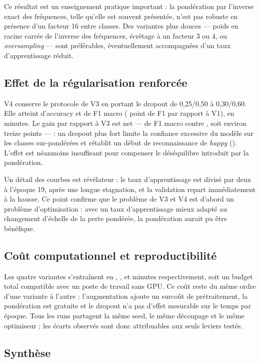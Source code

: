 \documentclass[11pt,a4paper]{article}
\begin{document}
Ce résultat est un enseignement pratique important : la pondération par
l'inverse exact des fréquences, telle qu'elle est souvent présentée, n'est pas
robuste en présence d'un facteur 16 entre classes. Des variantes plus douces
— poids en racine carrée de l'inverse des fréquences, écrêtage à un facteur 3
ou 4, ou \emph{oversampling} — sont préférables, éventuellement accompagnées
d'un taux d'apprentissage réduit.

\subsection{Effet de la régularisation renforcée}

V4 conserve le protocole de V3 en portant le dropout de 0,25/0,50 à
0,30/0,60. Elle atteint \AccFour{} d'accuracy et \FFour{} de F1 macro
(\GapFFour{} point de F1 par rapport à V1), en \TimeFour{} minutes. Le gain par
rapport à V3 est net — \FFour{} de F1 macro contre \FThree{}, soit environ
treize points — : un dropout plus fort limite la confiance excessive du modèle
sur les classes sur-pondérées et rétablit un début de reconnaissance de
\emph{happy} (\FHappyFour). L'effet est néanmoins insuffisant pour compenser le
déséquilibre introduit par la pondération.

Un détail des courbes est révélateur : le taux d'apprentissage est divisé par
deux à l'époque 19, après une longue stagnation, et la validation repart
immédiatement à la hausse. Ce point confirme que le problème de V3 et V4 est
d'abord un problème d'optimisation : avec un taux d'apprentissage mieux adapté
au changement d'échelle de la perte pondérée, la pondération aurait pu être
bénéfique.

\subsection{Coût computationnel et reproductibilité}

Les quatre variantes s'entraînent en \TimeOne{}, \TimeTwo{}, \TimeThree{} et
\TimeFour{} minutes respectivement, soit un budget total compatible avec un
poste de travail sans GPU. Ce coût reste du même ordre d'une variante à
l'autre : l'augmentation ajoute un surcoût de prétraitement, la pondération est
gratuite et le dropout n'a pas d'effet mesurable sur le temps par époque. Tous
les runs partagent la même seed, le même découpage et le même optimiseur ; les
écarts observés sont donc attribuables aux seuls leviers testés.

\subsection{Synthèse}
\end{document}
